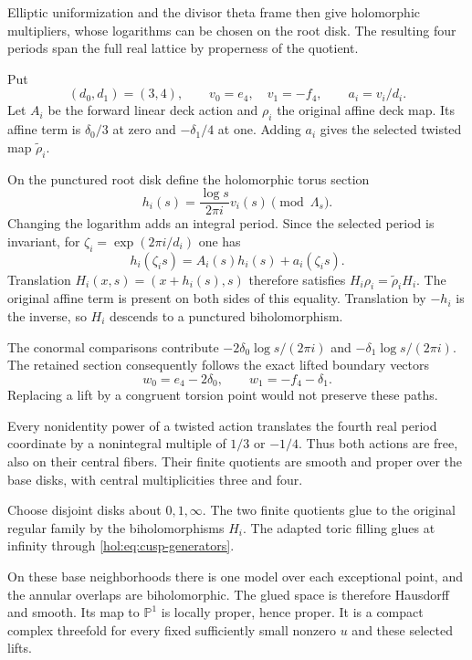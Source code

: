 \documentclass[11pt]{article}
\numberwithin{equation}{section}
\begin{document}
Elliptic uniformization and the divisor theta frame then give
holomorphic multipliers, whose logarithms can be chosen on the root
disk. The resulting four periods span the full real lattice by
properness of the quotient.

Put
\[
 (d_0,d_1)=(3,4),\qquad v_0=e_4,\quad v_1=-f_4,
 \qquad a_i=v_i/d_i.
\]
Let $A_i$ be the forward linear deck action and $\rho_i$ the
original affine deck map. Its affine term is $\delta_0/3$ at zero
and $-\delta_1/4$ at one. Adding $a_i$ gives the selected twisted
map $\widetilde\rho_i$.

On the punctured root disk define the holomorphic torus section
\[
 h_i(s)=\frac{\log s}{2\pi i}v_i(s)\pmod{\Lambda_s}.
\]
Changing the logarithm adds an integral period. Since the selected
period is invariant, for $\zeta_i=\exp(2\pi i/d_i)$ one has
\[
 h_i(\zeta_i s)=A_i(s)h_i(s)+a_i(\zeta_i s).
\]
Translation $H_i(x,s)=(x+h_i(s),s)$ therefore satisfies
$H_i\rho_i=\widetilde\rho_iH_i$. The original affine term is
present on both sides of this equality. Translation by $-h_i$ is
the inverse, so $H_i$ descends to a punctured biholomorphism.

The conormal comparisons contribute $-2\delta_0\log s/(2\pi i)$
and $-\delta_1\log s/(2\pi i)$. The retained section consequently
follows the exact lifted boundary vectors
\begin{equation}\label{hol:eq:boundary-vectors}
 w_0=e_4-2\delta_0,\qquad w_1=-f_4-\delta_1.
\end{equation}
Replacing a lift by a congruent torsion point would not preserve
these paths.

Every nonidentity power of a twisted action translates the fourth
real period coordinate by a nonintegral multiple of $1/3$ or
$-1/4$. Thus both actions are free, also on their central fibers.
Their finite quotients are smooth and proper over the base disks,
with central multiplicities three and four.

Choose disjoint disks about $0,1,\infty$. The two finite quotients
glue to the original regular family by the biholomorphisms $H_i$.
The adapted toric filling glues at infinity through
\eqref{hol:eq:cusp-generators}.

On these base neighborhoods there
is one model over each exceptional point, and the annular overlaps
are biholomorphic. The glued space is therefore Hausdorff and
smooth. Its map to $\mathbb P^1$ is locally proper, hence proper.
It is a compact complex threefold for every fixed sufficiently small
nonzero $u$ and these selected lifts.
\end{document}
